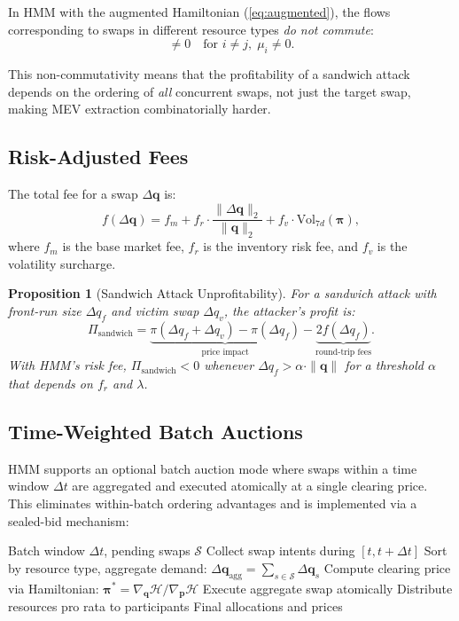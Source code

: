 \documentclass[11pt,twocolumn]{article}
\newtheorem{proposition}[theorem]{Proposition}
\begin{document}
In HMM with the augmented Hamiltonian (\ref{eq:augmented}), the flows corresponding to swaps in different resource types \emph{do not commute}:
\begin{equation}
[\phi_{\Delta q_i}, \phi_{\Delta q_j}] \neq 0 \quad \text{for } i \neq j, \; \mu_i \neq 0.
\end{equation}

This non-commutativity means that the profitability of a sandwich attack depends on the ordering of \emph{all} concurrent swaps, not just the target swap, making MEV extraction combinatorially harder.

\subsection{Risk-Adjusted Fees}

The total fee for a swap $\Delta\bm{q}$ is:
\begin{equation}
f(\Delta\bm{q}) = f_m + f_r \cdot \frac{\|\Delta\bm{q}\|_2}{\|\bm{q}\|_2} + f_v \cdot \text{Vol}_{7d}(\bm{\pi}),
\end{equation}
where $f_m$ is the base market fee, $f_r$ is the inventory risk fee, and $f_v$ is the volatility surcharge.

\begin{proposition}[Sandwich Attack Unprofitability]
For a sandwich attack with front-run size $\Delta q_f$ and victim swap $\Delta q_v$, the attacker's profit is:
\begin{equation}
\Pi_{\text{sandwich}} = \underbrace{\pi(\Delta q_f + \Delta q_v) - \pi(\Delta q_f)}_{\text{price impact}} - \underbrace{2f(\Delta q_f)}_{\text{round-trip fees}}.
\end{equation}
With HMM's risk fee, $\Pi_{\text{sandwich}} < 0$ whenever $\Delta q_f > \alpha \cdot \|\bm{q}\|$ for a threshold $\alpha$ that depends on $f_r$ and $\lambda$.
\end{proposition}

\subsection{Time-Weighted Batch Auctions}

HMM supports an optional batch auction mode where swaps within a time window $\Delta t$ are aggregated and executed atomically at a single clearing price. This eliminates within-batch ordering advantages and is implemented via a sealed-bid mechanism:

\begin{algorithm}[H]
\caption{HMM Batch Auction}
\label{alg:batch}
\begin{algorithmic}[1]
\Require Batch window $\Delta t$, pending swaps $\mathcal{S}$
\State Collect swap intents during $[t, t + \Delta t]$
\State Sort by resource type, aggregate demand: $\Delta\bm{q}_{\text{agg}} = \sum_{s \in \mathcal{S}} \Delta\bm{q}_s$
\State Compute clearing price via Hamiltonian: $\bm{\pi}^* = \nabla_{\bm{q}} \mathcal{H} / \nabla_{\bm{p}} \mathcal{H}$
\State Execute aggregate swap atomically
\State Distribute resources pro rata to participants
\State \Return Final allocations and prices
\end{algorithmic}
\end{algorithm}
\end{document}
